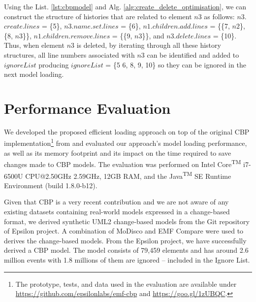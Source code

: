 \documentclass{llncs}
\begin{document}
{\vspace{-8pt}
Using the List. \ref{lst:cbpmodel} and Alg. \ref{alg:create_delete_optimisation}, we can construct the structure of histories that are related to element $n3$ as follows: $n3$.$create$.$lines$ = \{5\}, $n3$.$name$.$set$.$lines$ = \{6\}, $n1$.$children$.$add$.$lines$ = \{\{7, $n2$\}, \{8, $n3$\}\}, $n1$.$children$.$remove$.$lines$ = \{\{9, $n3$\}\}, and $n3$.$delete$.$lines$ = \{10\}. Thus, when element $n3$ is deleted, by iterating through all these history structures, all line numbers associated with $n3$ can be identified and added to $ignoreList$ producing $ignoreList$ = \{5 6, 8, 9, 10\} so they can be ignored in the next model loading.

\vspace{-15pt}
\section{Performance Evaluation}
\label{sec:performance_evaluation}

\vspace{-10pt}
We developed the proposed efficient loading approach on top of the original CBP implementation\footnote{The prototype, tests, and data used in the evaluation are available under \url{https://github.com/epsilonlabs/emf-cbp} and \url{https://goo.gl/1zUBQC}.} from \cite{yohannis2017turning} and evaluated our approach's model loading performance, as well as its memory footprint and its impact on the time required to save changes made to CBP models. The evaluation was performed on Intel\textsuperscript{\textregistered} Core\textsuperscript{TM} i7-6500U CPU@2.50GHz 2.59GHz, 12GB RAM, and the Java\textsuperscript{TM} SE Runtime Environment (build 1.8.0-b12).

Given that CBP is a very recent contribution and we are not aware of any existing datasets containing real-world models expressed in a change-based format, we derived synthetic UML2 \cite{eclipse2017uml2} change-based models from the Git repository of Epsilon \cite{eclipse2017epsilon,eclipse2018epsilongit} project. A combination of MoDisco \cite{DBLP:journals/infsof/BruneliereCDM14} and EMF Compare were used \cite{eclipse2017compare} to derives the change-based models. From the Epsilon project, we have successfully derived a CBP model. The model consists of 79,459 elements and has around 2.6 million events with 1.8 millions of them are ignored -- included in the Ignore List.

}
\end{document}
